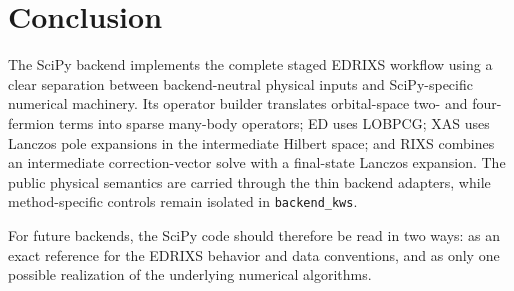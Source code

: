 \documentclass[11pt]{article}
\begin{document}
\section{Conclusion}

The SciPy backend implements the complete staged EDRIXS workflow using a clear separation between backend-neutral physical inputs and SciPy-specific numerical machinery.  Its operator builder translates orbital-space two- and four-fermion terms into sparse many-body operators; ED uses LOBPCG; XAS uses Lanczos pole expansions in the intermediate Hilbert space; and RIXS combines an intermediate correction-vector solve with a final-state Lanczos expansion.  The public physical semantics are carried through the thin backend adapters, while method-specific controls remain isolated in \texttt{backend\_kws}.

For future backends, the SciPy code should therefore be read in two ways: as an exact reference for the EDRIXS behavior and data conventions, and as only one possible realization of the underlying numerical algorithms.
\end{document}
